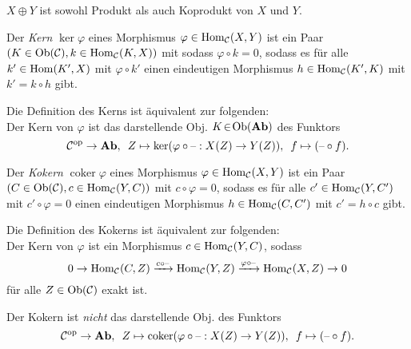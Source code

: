 \documentclass{cheat-sheet}
\DeclareMathOperator{\coker}{coker} %
\begin{document}
\begin{bem}
  $X \oplus Y$ ist sowohl Produkt als auch Koprodukt von $X$ und $Y$.
\end{bem}


\begin{defn}
  Der \emph{Kern} $\ker \varphi$ eines Morphismus $\varphi \in \operatorname{Hom}_{\mathcal{C}}(X, Y)$ ist
  ein Paar $(K \in \operatorname{Ob}(\mathcal{C}), k \in \operatorname{Hom}_{\mathcal{C}}(K, X))$ mit
  sodass $\varphi \circ k = 0$, sodass es für alle $k' \in \operatorname{Hom}(K', X)$ mit $\varphi \circ k'$ einen eindeutigen Morphismus $h \in \operatorname{Hom}_{\mathcal{C}}(K', K)$ mit $k' = k \circ h$ gibt.
\end{defn}

\begin{bem}
  Die Definition des Kerns ist äquivalent zur folgenden: \\
  Der Kern von $\varphi$ ist das darstellende Obj. $K \!\in\! \operatorname{Ob}(\mathbf{Ab})$ des Funktors
  \[
    \mathcal{C}^{\mathrm{op}} \to \mathbf{Ab}, \enspace
    Z \mapsto \ker(\varphi \circ \text{--} : X(Z) \to Y(Z)), \enspace
    f \mapsto (\text{--} \circ f).
  \]
\end{bem}


\begin{defn}
  Der \emph{Kokern} $\coker \varphi$ eines Morphismus $\varphi \in \operatorname{Hom}_{\mathcal{C}}(X, Y)$ ist ein Paar $(C \in \operatorname{Ob}(\mathcal{C}), c \in \operatorname{Hom}_{\mathcal{C}}(Y, C))$ mit $c \circ \varphi = 0$, sodass es für alle $c' \in \operatorname{Hom}_{\mathcal{C}}(Y, C')$ mit $c' \circ \varphi = 0$ einen eindeutigen Morphismus $h \in \operatorname{Hom}_{\mathcal{C}}(C, C')$ mit $c' = h \circ c$ gibt.
\end{defn}


\begin{bem}
  Die Definition des Kokerns ist äquivalent zur folgenden: \\
  Der Kern von $\varphi$ ist ein Morphismus $c \in \operatorname{Hom}_{\mathcal{C}}(Y, C)$, sodass
  \[ 0 \to \operatorname{Hom}_{\mathcal{C}}(C, Z) \xrightarrow{c \circ \text{--}} \operatorname{Hom}_{\mathcal{C}}(Y, Z) \xrightarrow{\varphi \circ \text{--}} \operatorname{Hom}_{\mathcal{C}}(X, Z) \to 0 \]
  für alle $Z \in \operatorname{Ob}(\mathcal{C})$ exakt ist.
\end{bem}

\begin{acht}
  Der Kokern ist \textit{nicht} das darstellende Obj. des Funktors
  \[
    \Cat^\op \to \AbGrp, \enspace
    Z \mapsto \coker(\varphi \circ \blank : X(Z) \to Y(Z)), \enspace
    f \mapsto (\blank \circ f).
  \]
\end{acht}
\end{document}
